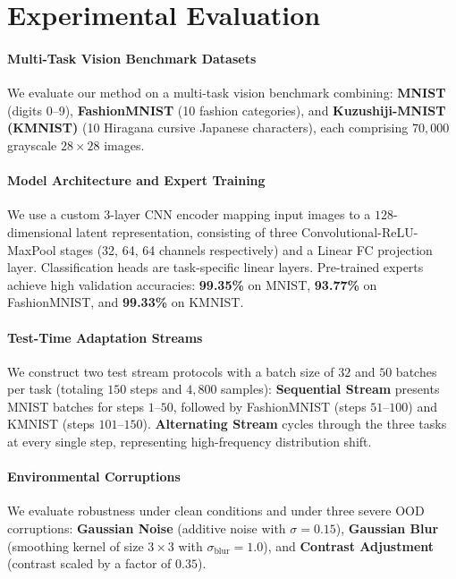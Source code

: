 \documentclass{article}
\begin{document}
\section{Experimental Evaluation}
\label{sec:experiments}

\paragraph{Multi-Task Vision Benchmark Datasets}
We evaluate our method on a multi-task vision benchmark combining: \textbf{MNIST} \cite{lecun1998gradient} (digits 0--9), \textbf{FashionMNIST} \cite{xiao2017fashion} (10 fashion categories), and \textbf{Kuzushiji-MNIST (KMNIST)} \cite{clanuwat2018deep} (10 Hiragana cursive Japanese characters), each comprising $70,000$ grayscale $28 \times 28$ images.

\paragraph{Model Architecture and Expert Training}
We use a custom 3-layer CNN encoder mapping input images to a $128$-dimensional latent representation, consisting of three Convolutional-ReLU-MaxPool stages (32, 64, 64 channels respectively) and a Linear FC projection layer. Classification heads are task-specific linear layers. Pre-trained experts achieve high validation accuracies: \textbf{99.35\%} on MNIST, \textbf{93.77\%} on FashionMNIST, and \textbf{99.33\%} on KMNIST.

\paragraph{Test-Time Adaptation Streams}
We construct two test stream protocols with a batch size of $32$ and $50$ batches per task (totaling $150$ steps and $4,800$ samples): \textbf{Sequential Stream} presents MNIST batches for steps $1$--$50$, followed by FashionMNIST (steps $51$--$100$) and KMNIST (steps $101$--$150$). \textbf{Alternating Stream} cycles through the three tasks at every single step, representing high-frequency distribution shift.

\paragraph{Environmental Corruptions}
We evaluate robustness under clean conditions and under three severe OOD corruptions: \textbf{Gaussian Noise} (additive noise with $\sigma = 0.15$), \textbf{Gaussian Blur} (smoothing kernel of size $3 \times 3$ with $\sigma_{\text{blur}} = 1.0$), and \textbf{Contrast Adjustment} (contrast scaled by a factor of $0.35$).
\end{document}
